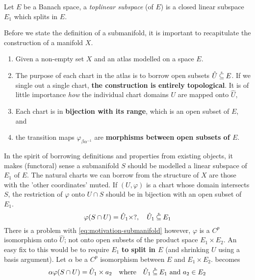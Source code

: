 \documentclass[../main-v2-manifolds.tex]{subfiles}
\begin{document}
\begin{definition}\label{def:toplinear-subspace}
    Let $E$ be a Banach space, a \emph{toplinear subspace} (of $E$) is a closed linear subspace $E_1$ which splits in $E$.
\end{definition}

%
%
Before we state the definition of a submanifold, it is important to recapitulate the construction of a manifold $X$.
\begin{enumerate}
    \item Given a non-empty set $X$ and an atlas modelled on a space $E$.
    \item The purpose of each chart in the atlas is to borrow open subsets $\hat{U}\:\mathring{\subseteq}\: E$. If we single out a single chart, \textbf{the construction is entirely topological}. It is of little importance \emph{how} the individual chart domains $U$ are mapped onto $\hat{U}$,
    \item Each chart is in \textbf{bijection with its range}, which is an open subset of $E$, and
    \item the transition maps $\varphi_{\beta\alpha^{-1}}$ are \textbf{morphisms between open subsets of $E$}.
\end{enumerate}
In the spirit of borrowing definitions and properties from existing objects, it makes (functoral) sense a submanifold $S$ should be modelled a linear subspace of $E_1$ of $E$. The natural charts we can borrow from the structure of $X$ are those with the 'other coordinates' muted. If $(U,\varphi)$ is a chart whose domain intersects $S$, the restriction of $\varphi$ onto $U\cap S$ should be in bijection with an open subset of $E_1$. 
\begin{equation}\label{eq:motivation-submanifold}
    \varphi(S\cap U) = \hat{U}_1\times ?,\quad \hat{U}_1\:\mathring{\subseteq}\: E_1
\end{equation}
There is a problem with \cref{eq:motivation-submanifold} however, $\varphi$ is a $C^p$ isomorphism onto $\hat{U}$; not onto open subsets of the product space $E_1\times E_2$. An easy fix to this would be to require $E_1$ \textbf{to split in $E$} (and shrinking $U$ using a basis argument). Let $\alpha$ be a $C^p$ isomorphism between $E$ and $E_1\times E_2$.  becomes
\begin{equation}\label{eq:motivation-submanifold-modified}
    \alpha\varphi(S\cap U) = \hat{U}_1\times a_2\qqtext{where} \hat{U}_1\osub E_1 \text{ and }a_2\in E_2
\end{equation}
\end{document}
